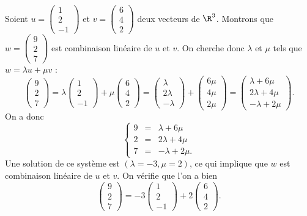 \documentclass[class=report,crop=false]{standalone}
\begin{document}
\begin{exemple}
   Soient $u = \left(\begin{smallmatrix}1\\ 2\\ -1\end{smallmatrix}\right)$ et $v =
   \left(\begin{smallmatrix}6\\4\\2\end{smallmatrix}\right)$ deux vecteurs de $\R^3$. Montrons que $w =
   \left(\begin{smallmatrix}9\\ 2\\ 7\end{smallmatrix}\right)$ est combinaison linéaire de $u$ et $v$.
   On cherche donc $\lambda$ et $\mu$ tels que $w=\lambda u + \mu v$ :
$$\left(\begin{matrix}9\\2\\7\end{matrix}\right)
  =  \lambda \left(\begin{matrix}1\\2\\-1\end{matrix}\right) + \mu \left(\begin{matrix}6\\4\\2\end{matrix}\right)
  =  \left(\begin{matrix}\lambda\\ 2\lambda\\ -\lambda\end{matrix}\right) + \left(\begin{matrix}6\mu\\ 4\mu\\ 2\mu\end{matrix}\right)
  =  \left(\begin{matrix}\lambda + 6\mu\\ 2\lambda + 4\mu\\ -\lambda + 2\mu\end{matrix}\right).$$
  On a donc
\[
\left\{
\begin{array}{rcl}
9 & = & \lambda + 6\mu\\ 2 & = & 2\lambda + 4\mu\\ 7 & = & -\lambda + 2\mu.
\end{array}\right.
\]
Une solution de ce système est $(\lambda = -3, \mu = 2)$,
ce qui implique que $w$ est combinaison linéaire de $u$ et $v$. On vérifie que l'on a bien
\[\begin{pmatrix}9\\2\\7\end{pmatrix} =  -3\begin{pmatrix}1\\2\\-1\end{pmatrix}
+ 2\begin{pmatrix}6\\4\\2\end{pmatrix}.\]
\end{exemple}
\end{document}
